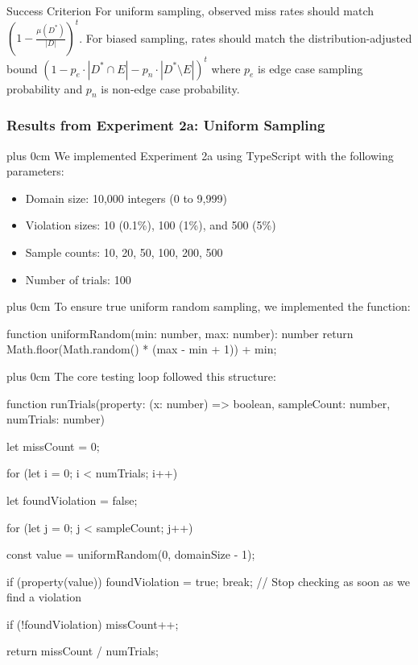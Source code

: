 \documentclass[conference]{IEEEtran}
\newcommand{\justifytext}{\leftskip=0pt \rightskip=0pt plus 0cm}
\begin{document}
\begin{definitionbox}{Success Criterion}
For uniform sampling, observed miss rates should match $\left(1 - \frac{\mu(D^*)}{|D|}\right)^t$. For biased sampling, rates should match the distribution-adjusted bound $(1 - p_e\cdot|D^*\cap E| - p_n\cdot|D^*\setminus E|)^t$ where $p_e$ is edge case sampling probability and $p_n$ is non-edge case probability.
\end{definitionbox}

\subsubsection{Results from Experiment 2a: Uniform Sampling}

\justifytext
We implemented Experiment 2a using TypeScript with the following parameters:

\begin{itemize}
\item Domain size: 10,000 integers (0 to 9,999)
\item Violation sizes: 10 (0.1\%), 100 (1\%), and 500 (5\%)
\item Sample counts: 10, 20, 50, 100, 200, 500
\item Number of trials: 100
\end{itemize}

\justifytext
To ensure true uniform random sampling, we implemented the function:

\begin{wrappedcode}
function uniformRandom(min: number, max: number): number {
  return Math.floor(Math.random() * (max - min + 1)) + min;
}
\end{wrappedcode}

\justifytext
The core testing loop followed this structure:

\begin{wrappedcode}
function runTrials(property: (x: number) => boolean, sampleCount: number, numTrials: number) {
  let missCount = 0;

  for (let i = 0; i < numTrials; i++) {
    let foundViolation = false;
    
    for (let j = 0; j < sampleCount; j++) {
      const value = uniformRandom(0, domainSize - 1);
      
      if (property(value)) {
        foundViolation = true;
        break; // Stop checking as soon as we find a violation
      }
    }
    
    if (!foundViolation) {
      missCount++;
    }
  }

  return missCount / numTrials;
}
\end{wrappedcode}
\end{document}
